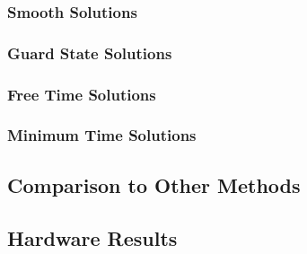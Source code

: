 \documentclass{article}
\begin{document}
\subsubsection*{Smooth Solutions}

\subsubsection*{Guard State Solutions}

\subsubsection*{Free Time Solutions}

\subsubsection*{Minimum Time Solutions}


\subsection{Comparison to Other Methods}

\subsection{Hardware Results}


\newpage
\end{document}
